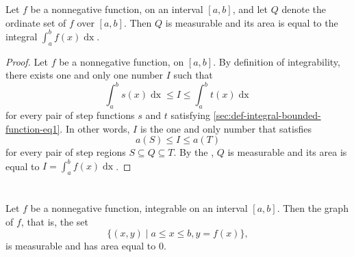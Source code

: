 \documentclass{report}
\begin{document}
\section{}%
\label{sec:measurability-ordinate-sets}
\label{sec:theorem-1.10}

\begin{theorem}{1.10}

  Let $f$ be a nonnegative function,  on an interval
    $[a, b]$, and let $Q$ denote the ordinate set of $f$ over $[a, b]$.
  Then $Q$ is measurable and its area is equal to the integral
    $\int_a^b f(x) \mathop{dx}$.

\end{theorem}

\begin{proof}

  Let $f$ be a nonnegative function,  on $[a, b]$.
  By definition of integrability, there exists one and only one number $I$ such
    that $$\int_a^b s(x) \mathop{dx} \leq I \leq \int_a^b t(x) \mathop{dx}$$ for
    every pair of step functions $s$ and $t$ satisfying
    \eqref{sec:def-integral-bounded-function-eq1}.
  In other words, $I$ is the one and only number that satisfies
    $$a(S) \leq I \leq a(T)$$ for every pair of step regions
    $S \subseteq Q \subseteq T$.
  By the , $Q$ is measurable and its area
    is equal to $I = \int_a^b f(x) \mathop{dx}$.

\end{proof}

\section{}%
\label{sec:measurability-graph-nonnegative-function}
\label{sec:theorem-1.11}

\begin{theorem}{1.11}

  Let $f$ be a nonnegative function, integrable on an interval $[a, b]$.
  Then the graph of $f$, that is, the set
    \begin{equation}
      \label{sec:measurability-graph-nonnegative-function-eq1}
      \{(x, y) \mid a \leq x \leq b, y = f(x)\},
    \end{equation}
    is measurable and has area equal to $0$.

\end{theorem}
\end{document}
